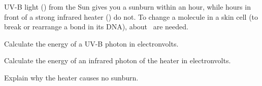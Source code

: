 UV-B light (\laO) from the Sun gives you a sunburn within an hour, while hours in front of a strong infrared heater (\lbO) do not. To change a molecule in a skin cell (to break or rearrange a bond in its DNA), about \EcO\ are needed.

\begin{abcliste}
\abc Calculate the energy of a UV-B photon in electronvolts.

\abc Calculate the energy of an infrared photon of the heater in electronvolts.

\abc Explain why the heater causes no sunburn.
\end{abcliste}
